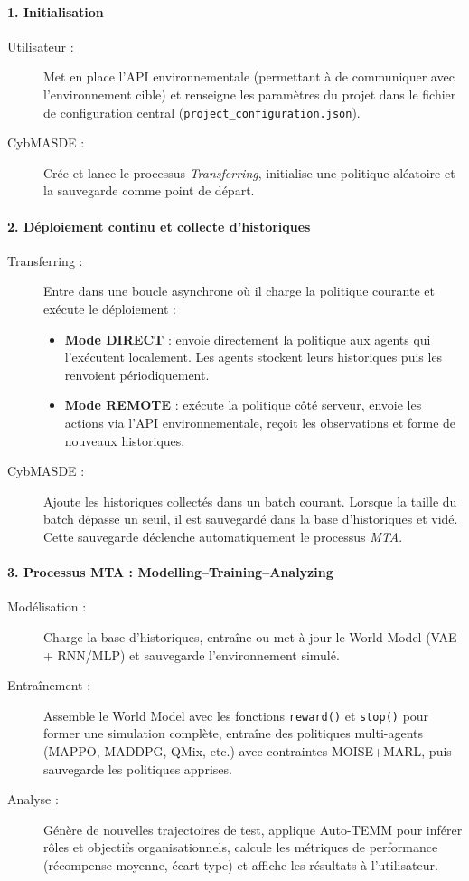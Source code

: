 \paragraph{1. Initialisation}
\begin{description}
  \item[Utilisateur :] Met en place l’API environnementale (permettant à  de communiquer avec l’environnement cible) et renseigne les paramètres du projet dans le fichier de configuration central (\texttt{project\_configuration.json}).
  \item[CybMASDE :] Crée et lance le processus \textit{Transferring}, initialise une politique aléatoire et la sauvegarde comme point de départ.
\end{description}

\paragraph{2. Déploiement continu et collecte d’historiques}
\begin{description}
  \item[Transferring :] Entre dans une boucle asynchrone où il charge la politique courante et exécute le déploiement :
    \begin{itemize}
      \item \textbf{Mode DIRECT} : envoie directement la politique aux agents qui l’exécutent localement. Les agents stockent leurs historiques puis les renvoient périodiquement.
      \item \textbf{Mode REMOTE} : exécute la politique côté serveur, envoie les actions via l’API environnementale, reçoit les observations et forme de nouveaux historiques.
    \end{itemize}
  \item[CybMASDE :] Ajoute les historiques collectés dans un batch courant. Lorsque la taille du batch dépasse un seuil, il est sauvegardé dans la base d’historiques et vidé. Cette sauvegarde déclenche automatiquement le processus \textit{MTA}.
\end{description}

\paragraph{3. Processus MTA : Modelling–Training–Analyzing}
\begin{description}
  \item[Modélisation :] Charge la base d’historiques, entraîne ou met à jour le World Model (VAE + RNN/MLP) et sauvegarde l’environnement simulé.
  \item[Entraînement :] Assemble le World Model avec les fonctions \texttt{reward()} et \texttt{stop()} pour former une simulation complète, entraîne des politiques multi-agents (MAPPO, MADDPG, QMix, etc.) avec contraintes MOISE+MARL, puis sauvegarde les politiques apprises.
  \item[Analyse :] Génère de nouvelles trajectoires de test, applique Auto-TEMM pour inférer rôles et objectifs organisationnels, calcule les métriques de performance (récompense moyenne, écart-type) et affiche les résultats à l’utilisateur.
\end{description}

